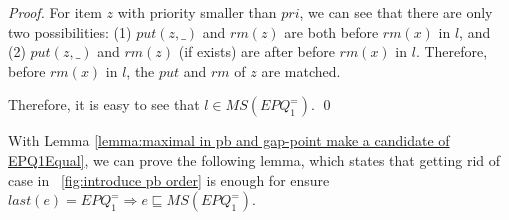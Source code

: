 \begin {proof}
For item $z$ with priority smaller than $\textit{pri}$, we can see that there are only two possibilities: (1) $\textit{put}(z,\_)$ and $\textit{rm}(z)$ are both before $\textit{rm}(x)$ in $l$, and (2) $\textit{put}(z,\_)$ and $\textit{rm}(z)$ (if exists) are after before $\textit{rm}(x)$ in $l$. Therefore, before $\textit{rm}(x)$ in $l$, the $\textit{put}$ and $\textit{rm}$ of $z$ are matched.

Therefore, it is easy to see that $l \in \textit{MS}(\textit{EPQ}_1^{=})$. \qed
\end {proof}

With Lemma \ref{lemma:maximal in pb and gap-point make a candidate of EPQ1Equal}, we can prove the following lemma, which states that getting rid of case in \figurename~\ref{fig:introduce pb order} is enough for ensure $\textit{last}(e) = \textit{EPQ}_1^{=} \Rightarrow e \sqsubseteq \textit{MS}(\textit{EPQ}_1^{=})$.


\EPQOneEqualAsPBandGP*

